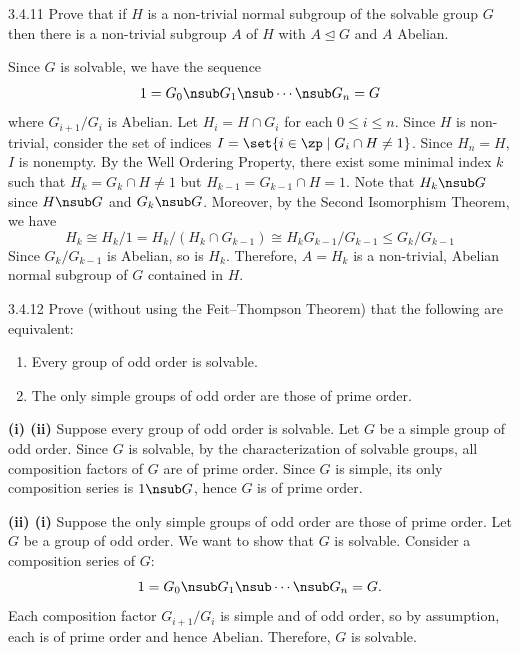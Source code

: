 \begin{exercise}{3.4.11}
    Prove that if $H$ is a non-trivial normal subgroup of the solvable group $G$ then there is a non-trivial subgroup $A$ of $H$ with $A \trianglelefteq G$ and $A$ Abelian.
\end{exercise}

\begin{sol}
    Since $G$ is solvable, we have the sequence
    \[
    	1 = G_0 \nsub G_1 \nsub \cdots \nsub G_n = G
    \]
    where $G_{i + 1}/G_i$ is Abelian.
	Let $H_i = H \cap G_i$ for each $0 \leq i \leq n$.
	Since $H$ is non-trivial, consider the set of indices $I = \set{i \in \zp \mid G_i \cap H \neq 1}$.
	Since $H_n = H$, $I$ is nonempty.
	By the Well Ordering Property, there exist some minimal index $k$ such that $H_k = G_k \cap H \neq 1$ but $H_{k - 1} = G_{k - 1} \cap H = 1$.
	Note that $H_k \nsub G$ since $H \nsub G$ and $G_k \nsub G$.
	Moreover, by the Second Isomorphism Theorem, we have
    \[
    	H_k \cong H_k/1 = H_k/(H_k \cap G_{k - 1}) \cong H_k G_{k - 1}/G_{k - 1} \leq G_k/G_{k - 1}
    \]
    Since $G_k/G_{k - 1}$ is Abelian, so is $H_k$.
	Therefore, $A = H_k$ is a non-trivial, Abelian normal subgroup of $G$ contained in $H$.
\end{sol}

\begin{exercise}{3.4.12}
    Prove (without using the Feit--Thompson Theorem) that the following are equivalent:
    \begin{enumerate}
    \item[(i)] Every group of odd order is solvable.
    \item[(ii)] The only simple groups of odd order are those of prime order.
    \end{enumerate}
\end{exercise}

\begin{sol}
    \textbf{(i) \rightimp (ii)} Suppose every group of odd order is solvable.
	Let $G$ be a simple group of odd order.
	Since $G$ is solvable, by the characterization of solvable groups, all composition factors of $G$ are of prime order.
	Since $G$ is simple, its only composition series is $1 \nsub G$, hence $G$ is of prime order.

    \noindent \textbf{(ii) \rightimp (i)} Suppose the only simple groups of odd order are those of prime order.
	Let $G$ be a group of odd order.
	We want to show that $G$ is solvable.
	Consider a composition series of $G$:
    \[
    	1 = G_0 \nsub G_1 \nsub \cdots \nsub G_n = G.
    \]
    Each composition factor $G_{i+1}/G_i$ is simple and of odd order, so by assumption, each is of prime order and hence Abelian.
	Therefore, $G$ is solvable.
\end{sol}